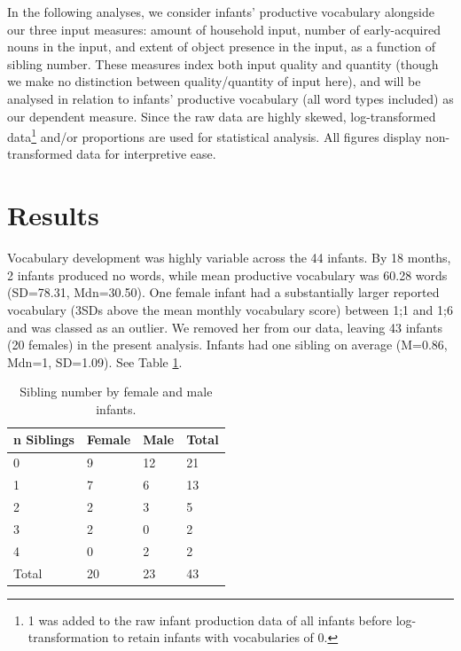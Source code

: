 \documentclass[
  english,
  man,floatsintext]{apa6}
\begin{document}
In the following analyses, we consider infants' productive vocabulary alongside our three input measures: amount of household input, number of early-acquired nouns in the input, and extent of object presence in the input, as a function of sibling number. These measures index both input quality and quantity (though we make no distinction between quality/quantity of input here), and will be analysed in relation to infants' productive vocabulary (all word types included) as our dependent measure. Since the raw data are highly skewed, log-transformed data\footnote{1 was added to the raw infant production data of all infants before log-transformation to retain infants with vocabularies of 0.} and/or proportions are used for statistical analysis. All figures display non-transformed data for interpretive ease.

\hypertarget{results}{%
\section{Results}\label{results}}

Vocabulary development was highly variable across the 44 infants. By 18 months, 2 infants produced no words, while mean productive vocabulary was 60.28 words (SD=78.31, Mdn=30.50). One female infant had a substantially larger reported vocabulary (3SDs above the mean monthly vocabulary score) between 1;1 and 1;6 and was classed as an outlier. We removed her from our data, leaving 43 infants (20 females) in the present analysis. Infants had one sibling on average (M=0.86, Mdn=1, SD=1.09). See Table \ref{tab:table-sibling-number}.

\begin{table}[H]

\begin{center}
\begin{threeparttable}

\caption{\label{tab:table-sibling-number}Sibling number by female and male infants.}

\small{

\begin{tabular}{llll}
\toprule
n Siblings & \multicolumn{1}{c}{Female} & \multicolumn{1}{c}{Male} & \multicolumn{1}{c}{Total}\\
\midrule
0 & 9 & 12 & 21\\
1 & 7 & 6 & 13\\
2 & 2 & 3 & 5\\
3 & 2 & 0 & 2\\
4 & 0 & 2 & 2\\
Total & 20 & 23 & 43\\
\bottomrule
\end{tabular}

}

\end{threeparttable}
\end{center}

\end{table}
\end{document}
